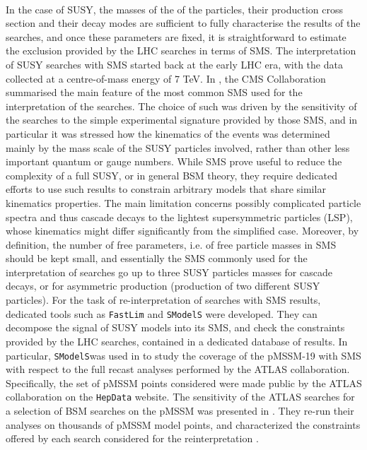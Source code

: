 \documentclass[preprint,number,sort&compress,twocolumn,3p]{elsstyarticle}
\newcommand{\SMO}{\texttt{SModelS\xspace}}
\newcommand{\FASTLIM}{\texttt{FastLim}}
\begin{document}
\\
In the case of SUSY, the masses of the of the particles, their production cross section and their decay modes are sufficient to fully characterise the results of the searches, and once these parameters are fixed, it is straightforward to estimate the exclusion provided by the LHC searches in terms of SMS. The interpretation of SUSY searches with SMS started back at the early LHC era, with the data collected at a centre-of-mass energy of 7 TeV. In \cite{Chatrchyan:2013sza}, the CMS Collaboration summarised the main feature of the most common SMS used for the interpretation of the searches. The choice of such was driven by the sensitivity of the searches to the simple experimental signature provided by those SMS, and in particular it was stressed how the kinematics of the events was determined mainly by the mass scale of the SUSY particles involved, rather than other less important quantum or gauge numbers. While SMS prove useful to reduce the complexity of a full SUSY, or in general BSM theory, they require dedicated efforts to use such results to constrain arbitrary models that share similar kinematics properties. The main limitation concerns possibly complicated particle spectra and thus cascade decays to the lightest supersymmetric particles (LSP), whose kinematics might differ significantly from the simplified case. Moreover, by definition, the number of free parameters, i.e. of free particle masses in SMS should be kept small, and essentially the SMS commonly used for the interpretation of searches go up to three SUSY particles masses for cascade decays, or for asymmetric production (production of two different SUSY particles).
For the task of re-interpretation of searches with SMS results, 
dedicated tools such as \FASTLIM \cite{Papucci:2014rja} and \SMO \cite{Kraml:2014sna} were developed. They can decompose the signal of SUSY models into its SMS, and check the constraints provided by the LHC searches, contained in a dedicated database of results. In particular, \SMO was used in \cite{Ambrogi:2017lov} to study the coverage of the pMSSM-19\cite{Djouadi:1998di} with SMS with respect to the full recast analyses performed by the ATLAS collaboration. Specifically, the set of pMSSM points considered were made public by the ATLAS collaboration on the \texttt{HepData} website\cite{ATLASpMSSMhepdata}. The sensitivity of the ATLAS searches for a selection of BSM searches on the pMSSM was presented in \cite{Aad:2015baa}. They re-run their analyses on thousands of pMSSM model points, and characterized the constraints offered by each search considered for the reinterpretation .
\end{document}

